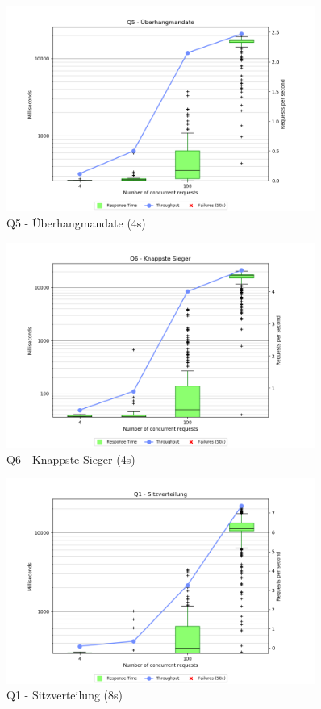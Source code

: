 \documentclass[a4paper]{scrreprt}
\begin{document}
\begin{figure}[h]
\centering
\includegraphics[width=0.9\textwidth]{images/plots_4s/Q5}
\caption {Q5 - Überhangmandate (4s)}
\end{figure}

\begin{figure}[h]
\centering
\includegraphics[width=0.9\textwidth]{images/plots_4s/Q6}
\caption {Q6 - Knappste Sieger (4s)}
\end{figure}


\begin{figure}[h]
\centering
\includegraphics[width=0.9\textwidth]{images/plots_8s/Q1}
\caption {Q1 - Sitzverteilung (8s)}
\end{figure}
\end{document}
